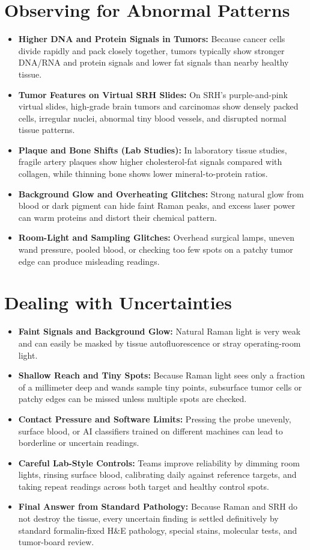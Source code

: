 \section{Observing for Abnormal Patterns}
\begin{itemize}
  \item \textbf{Higher DNA and Protein Signals in Tumors:} Because cancer cells divide rapidly and pack closely together, tumors typically show stronger DNA/RNA and protein signals and lower fat signals than nearby healthy tissue.
  \item \textbf{Tumor Features on Virtual SRH Slides:} On SRH's purple-and-pink virtual slides, high-grade brain tumors and carcinomas show densely packed cells, irregular nuclei, abnormal tiny blood vessels, and disrupted normal tissue patterns.
  \item \textbf{Plaque and Bone Shifts (Lab Studies):} In laboratory tissue studies, fragile artery plaques show higher cholesterol-fat signals compared with collagen, while thinning bone shows lower mineral-to-protein ratios.
  \item \textbf{Background Glow and Overheating Glitches:} Strong natural glow from blood or dark pigment can hide faint Raman peaks, and excess laser power can warm proteins and distort their chemical pattern.
  \item \textbf{Room-Light and Sampling Glitches:} Overhead surgical lamps, uneven wand pressure, pooled blood, or checking too few spots on a patchy tumor edge can produce misleading readings.
\end{itemize}

\section{Dealing with Uncertainties}
\begin{itemize}
  \item \textbf{Faint Signals and Background Glow:} Natural Raman light is very weak and can easily be masked by tissue autofluorescence or stray operating-room light.
  \item \textbf{Shallow Reach and Tiny Spots:} Because Raman light sees only a fraction of a millimeter deep and wands sample tiny points, subsurface tumor cells or patchy edges can be missed unless multiple spots are checked.
  \item \textbf{Contact Pressure and Software Limits:} Pressing the probe unevenly, surface blood, or AI classifiers trained on different machines can lead to borderline or uncertain readings.
  \item \textbf{Careful Lab-Style Controls:} Teams improve reliability by dimming room lights, rinsing surface blood, calibrating daily against reference targets, and taking repeat readings across both target and healthy control spots.
  \item \textbf{Final Answer from Standard Pathology:} Because Raman and SRH do not destroy the tissue, every uncertain finding is settled definitively by standard formalin-fixed H\&E pathology, special stains, molecular tests, and tumor-board review.
\end{itemize}

